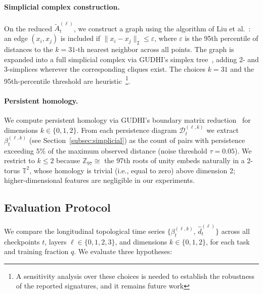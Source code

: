 \paragraph{Simplicial complex construction.}
On the reduced $\tilde{A}^{(\ell)}_t$, we construct a graph using the algorithm of Liu et al.~\cite{QuickMapper}: an edge $(x_i, x_j)$ is included if $\|x_i - x_j\|_2 \leq \varepsilon$, where $\varepsilon$ is the 95th percentile of distances to the $k=31$-th nearest neighbor across all points. The graph is expanded into a full simplicial complex via GUDHI's simplex tree~\cite{GUDHI}, adding 2- and 3-simplices wherever the corresponding cliques exist. The choices $k = 31$ and the 95th-percentile threshold are heuristic~\footnote{A sensitivity analysis over these choices is needed to establish the robustness of the reported signatures, and it remains future work}.

\paragraph{Persistent homology.}
We compute persistent homology via GUDHI's boundary matrix
reduction~\cite{GUDHI} for dimensions $k \in \{0, 1, 2\}$.
From each persistence diagram $\mathcal{D}^{(\ell,k)}_t$ we extract
$\beta^{(\ell,k)}_t$ (see Section~\ref{subsec:simplicial}) as the count of pairs with persistence exceeding
$5\%$ of the maximum observed distance (noise threshold $\tau = 0.05$).
We restrict to $k \leq 2$ because $\mathbb{Z}_{97} \cong$ the 97th
roots of unity embeds naturally in a 2-torus $\mathbb{T}^2$, whose
homology is trivial (i.e., equal to zero) above dimension 2; higher-dimensional features are
negligible in our experiments.

\subsection{Evaluation Protocol}
\label{subsec:eval}

We compare the longitudinal topological time series
$\{\beta^{(\ell,k)}_t,\, \hat{d}^{(\ell)}_t\}$ across all checkpoints
$t$, layers $\ell \in \{0,1,2,3\}$, and dimensions $k \in \{0,1,2\}$,
for each task and training fraction $q$. %
We evaluate three hypotheses:

